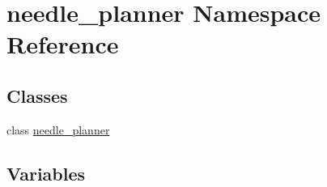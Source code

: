 \hypertarget{namespaceneedle__planner}{}\section{needle\+\_\+planner Namespace Reference}
\label{namespaceneedle__planner}
\subsection*{Classes}
\begin{DoxyCompactItemize}
\item 
class \hyperlink{classneedle__planner_1_1needle__planner}{needle\+\_\+planner}
\end{DoxyCompactItemize}
\subsection*{Variables}
